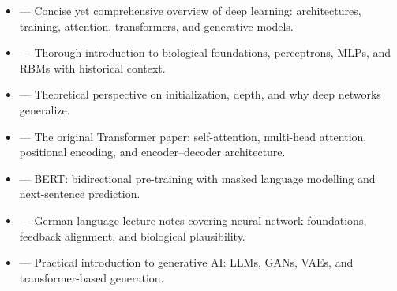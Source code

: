 \begin{tcbitemize}[ skin=sectionraster ]
    \tcbitem[title=Recommended Sources for Deep Learning, raster multicolumn=6]
    \begin{itemize}
        \item {} — Concise yet comprehensive overview of deep learning: architectures, training, attention, transformers, and generative models.
        \item {} — Thorough introduction to biological foundations, perceptrons, MLPs, and RBMs with historical context.
        \item {} — Theoretical perspective on initialization, depth, and why deep networks generalize.
        \item {} — The original Transformer paper: self-attention, multi-head attention, positional encoding, and encoder--decoder architecture.
        \item {} — BERT: bidirectional pre-training with masked language modelling and next-sentence prediction.
        \item {} — German-language lecture notes covering neural network foundations, feedback alignment, and biological plausibility.
        \item {} — Practical introduction to generative AI: LLMs, GANs, VAEs, and transformer-based generation.
    \end{itemize}
\end{tcbitemize}
